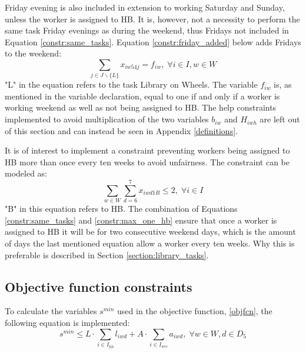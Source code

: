 Friday evening is also included in extension to working Saturday and Sunday, unless the worker is assigned to HB. It is, however, not a necessity to perform the same task Friday evenings as during the weekend, thus Fridays not included in Equation \ref{constr:same_tasks}. Equation \ref{constr:friday_added} below adds Fridays to the weekend:
\begin{equation} \label{constr:friday_added}
\sum_{j \in J \backslash \{L\}}x_{iw54j} = f_{iw}, \; \forall i \in I, w \in W
\end{equation}
"L" in the equation refers to the task Library on Wheels. The variable $f_{iw}$ is, as mentioned in the variable declaration, equal to one if and only if a worker is working weekend as well as not being assigned to HB. The help constraints implemented to avoid multiplication of the two variables $b_{iw}$ and $H_{iwh}$ are left out of this section and can instead be seen in Appendix \ref{definitions}.

It is of interest to implement a constraint preventing workers being assigned to HB more than once every ten weeks to avoid unfairness. The constraint can be modeled as:
\begin{equation} \label{constr:max_one_hb}
\sum_{w \in W}\sum_{d = 6}^{7}x_{iwd1B} \leq 2, \; \forall i \in I
\end{equation}
"B" in this equation refers to HB. The combination of Equations \ref{constr:same_tasks} and \ref{constr:max_one_hb} ensure that once a worker is assigned to HB it will be for two consecutive weekend days, which is the amount of days the last mentioned equation allow a worker every ten weeks. Why this is preferable is described in Section \ref{section:library_tasks}.

\subsection{Objective function constraints} \label{section:obj_fcn_constraints}
To calculate the variables $s^{min}$ used in the objective function, \ref{objfcn}, the following equation is implemented:
\begin{equation} \label{constr:s_min}
s^{min} \leq L\cdot \sum_{i \in I_{lib}} l_{iwd} + A\cdot \sum_{i \in I_{ass}} a_{iwd}, \; \forall w \in W, d \in D_5
\end{equation}

